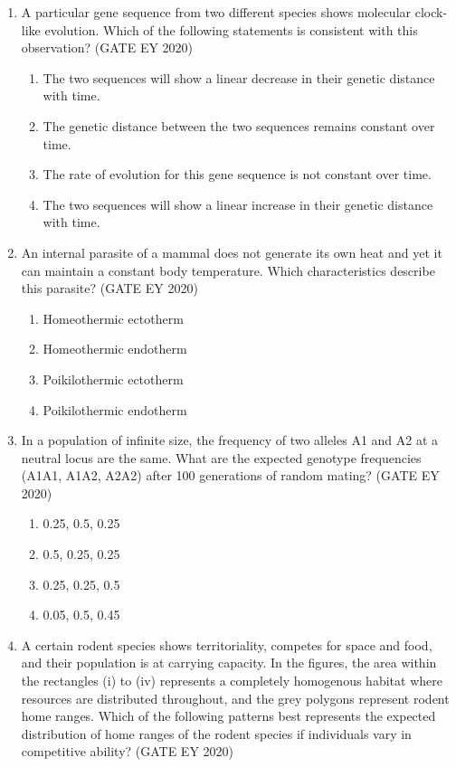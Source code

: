\begin{enumerate}
\item
A particular gene sequence from two different species shows molecular clock-like evolution. Which of the following statements is consistent with this observation? \hfill {(GATE EY 2020)}
\begin{multicols}{2}
\begin{enumerate}
\item The two sequences will show a linear decrease in their genetic distance with time.
\item The genetic distance between the two sequences remains constant over time.
\item The rate of evolution for this gene sequence is not constant over time.
\item The two sequences will show a linear increase in their genetic distance with time.
\end{enumerate}
\end{multicols}

\item
An internal parasite of a mammal does not generate its own heat and yet it can maintain a constant body temperature. Which characteristics describe this parasite? \hfill {(GATE EY 2020)}
\begin{multicols}{2}
\begin{enumerate}
\item Homeothermic ectotherm
\item Homeothermic endotherm
\item Poikilothermic ectotherm
\item Poikilothermic endotherm
\end{enumerate}
\end{multicols}

\item
In a population of infinite size, the frequency of two alleles A1 and A2 at a neutral locus are the same. What are the expected genotype frequencies (A1A1, A1A2, A2A2) after 100 generations of random mating? \hfill {(GATE EY 2020)}
\begin{multicols}{2}
\begin{enumerate}
\item 0.25, 0.5, 0.25
\item 0.5, 0.25, 0.25
\item 0.25, 0.25, 0.5
\item 0.05, 0.5, 0.45
\end{enumerate}
\end{multicols}
\item
A certain rodent species shows territoriality, competes for space and food, and their population is at carrying capacity. In the figures, the area within the rectangles (i) to (iv) represents a completely homogenous habitat where resources are distributed throughout, and the grey polygons represent rodent home ranges. Which of the following patterns best represents the expected distribution of home ranges of the rodent species if individuals vary in competitive ability? \hfill {(GATE EY 2020)}


\end{enumerate}
